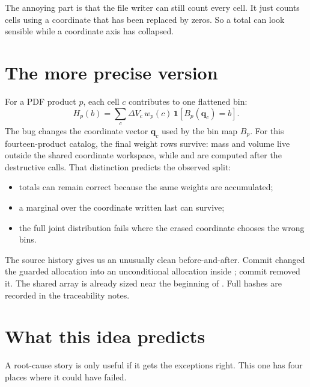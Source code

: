 \documentclass[11pt]{article}
\begin{document}
The annoying part is that the file writer can still count every cell. It just
counts cells using a coordinate that has been replaced by zeros. So a total can
look sensible while a coordinate axis has collapsed.

\section{The more precise version}

For a PDF product \(p\), each cell \(c\) contributes to one flattened bin:
\[
H_p(b) = \sum_c \Delta V_c\,w_p(c)\,
  \mathbf{1}\!\left[B_p(\boldsymbol{q}_c)=b\right].
\]
The bug changes the coordinate vector \(\boldsymbol{q}_c\) used by the bin map
\(B_p\). For this fourteen-product catalog, the final weight rows survive:
mass and volume live outside the shared coordinate workspace, while
 and  are computed after the destructive
calls. That distinction predicts the observed split:
\begin{itemize}
  \item totals can remain correct because the same weights are accumulated;
  \item a marginal over the coordinate written last can survive;
  \item the full joint distribution fails where the erased coordinate chooses
        the wrong bins.
\end{itemize}

The source history gives us an unusually clean before-and-after. Commit
 changed the guarded allocation into an unconditional
allocation inside ; commit 
removed it. The shared array is already sized near the beginning of
. Full hashes are recorded in the
traceability notes.

\section{What this idea predicts}

A root-cause story is only useful if it gets the exceptions right. This one
has four places where it could have failed.
\end{document}
